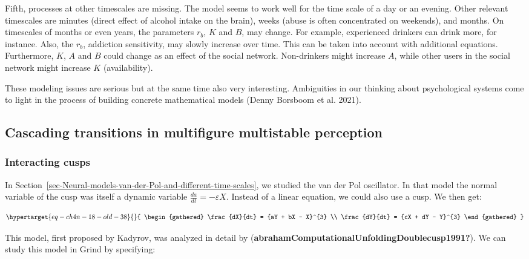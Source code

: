 \documentclass[
  a4paper,
  DIV=11,
  numbers=noendperiod]{scrreprt}
\begin{document}
Fifth, processes at other timescales are missing. The model seems to
work well for the time scale of a day or an evening. Other relevant
timescales are minutes (direct effect of alcohol intake on the brain),
weeks (abuse is often concentrated on weekends), and months. On
timescales of months or even years, the parameters \(r_{b}\), \(K\) and
\(B\), may change. For example, experienced drinkers can drink more, for
instance. Also, the \(r_{b}\), addiction sensitivity, may slowly
increase over time. This can be taken into account with additional
equations. Furthermore, \(K\), \(A\) and \(B\) could change as an effect
of the social network. Non-drinkers might increase \(A\), while other
users in the social network might increase \(K\) (availability).

These modeling issues are serious but at the same time also very
interesting. Ambiguities in our thinking about psychological systems
come to light in the process of building concrete mathematical models
(Denny Borsboom et al. 2021).

\hypertarget{sec-Cascading-transitions-in-multifigure-multistable-perception}{%
\subsection{Cascading transitions in multifigure multistable
perception}\label{sec-Cascading-transitions-in-multifigure-multistable-perception}}

\hypertarget{sec-Interacting-cusps}{%
\subsubsection{Interacting cusps}\label{sec-Interacting-cusps}}

In
Section~\ref{sec-Neural-models-van-der-Pol-and-different-time-scales},
we studied the van der Pol oscillator. In that model the normal variable
of the cusp was itself a dynamic variable
\(\frac{da}{dt}= - \varepsilon X\). Instead of a linear equation, we
could also use a cusp. We then get:

\begin{equation}\protect\hypertarget{eq-ch4n-18-old-38}{}{
\begin{gathered}
\frac{dX}{dt} = {aY + bX - X}^{3} \\
\frac{dY}{dt} = {cX + dY - Y}^{3} 
\end{gathered}
}\label{eq-ch4n-18-old-38}\end{equation}

This model, first proposed by Kadyrov, was analyzed in detail by
(\textbf{abrahamComputationalUnfoldingDoublecusp1991?}). We can study
this model in Grind by specifying:
\end{document}
